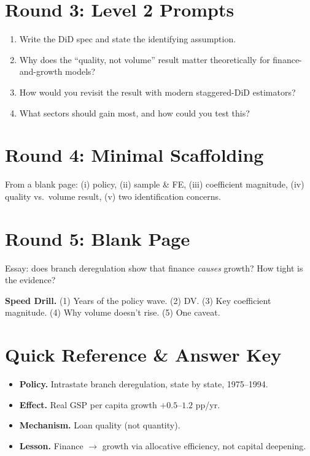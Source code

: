 \documentclass[11pt]{article}
\begin{document}
\section*{Round 3: Level 2 Prompts}
\begin{enumerate}
\item Write the DiD spec and state the identifying assumption.
\item Why does the ``quality, not volume'' result matter theoretically for finance-and-growth models?
\item How would you revisit the result with modern staggered-DiD estimators?
\item What sectors should gain most, and how could you test this?
\end{enumerate}

\section*{Round 4: Minimal Scaffolding}
From a blank page: (i) policy, (ii) sample \& FE, (iii) coefficient magnitude, (iv) quality vs.\ volume result, (v) two identification concerns.

\section*{Round 5: Blank Page}
Essay: does branch deregulation show that finance \emph{causes} growth? How tight is the evidence?

\vspace{6pt}
\begin{drillbox}
\textbf{Speed Drill.} (1) Years of the policy wave. (2) DV. (3) Key coefficient magnitude. (4) Why volume doesn't rise. (5) One caveat.
\end{drillbox}

\section*{Quick Reference \& Answer Key}
\begin{answerbox}
\begin{itemize}
\item \textbf{Policy.} Intrastate branch deregulation, state by state, 1975--1994.
\item \textbf{Effect.} Real GSP per capita growth $+0.5$--$1.2$ pp/yr.
\item \textbf{Mechanism.} Loan quality (not quantity).
\item \textbf{Lesson.} Finance $\to$ growth via allocative efficiency, not capital deepening.
\end{itemize}
\end{answerbox}
\end{document}
